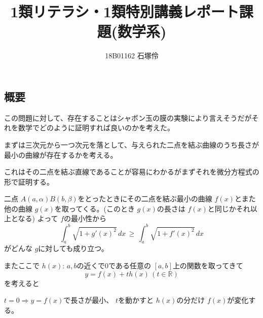 \documentclass[dvipdfmx]{jsarticle}
\title{1類リテラシ・1類特別講義レポート課題(数学系)}
\author{18B01162 石塚伶}
\date{}
\begin{document}
\maketitle
\subsection{概要}
この問題に対して、存在することはシャボン玉の膜の実験により言えそうだがそれを数学でどのように証明すれば良いのかを考えた。
\begin{multicols}{2}
    まずは三次元から一つ次元を落として、与えられた二点を結ぶ曲線のうち長さが最小の曲線が存在するかを考える。

    これはその二点を結ぶ直線であることが容易にわかるがまずそれを微分方程式の形で証明する。

    二点 $A(a,\alpha) B(b,\beta)$をとったときにその二点を結ぶ最小の曲線 $f(x)$とまた他の曲線 $g(x)$を取ってくる。(このとき $g(x)$の長さは $f(x)$と同じかそれ以上となる)
    よって $f$の最小性から
    \[
    \int_a^b \sqrt{1 + g'(x)^2} \, dx \, \geq \, \int_a^b \sqrt{1 + f'(x)^2} \, dx
    \]
    がどんな $g$に対しても成り立つ。

    またここで $h(x)$: $a,b$の近くで0である任意の $[a,b]$上の関数を取ってきて
    \[
    y = f(x) + th(x) \, (t \in \mathbb{R})
    \]
    を考えると

    $t = 0 \Rightarrow y = f(x)$で長さが最小、
    $t$を動かすと $h(x)$の分だけ $f(x)$が変化する。


\end{multicols}
\end{document}
